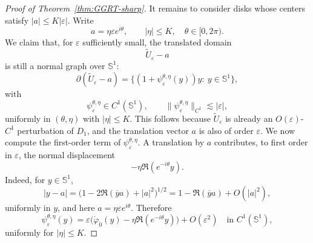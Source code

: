 \begin{proof}[Proof of Theorem~\ref{thm:GGRT-sharp}]
It remains to consider disks whose centers satisfy $|a|\leq K|\varepsilon|$.
Write
\[
a=\eta \varepsilon e^{i\theta},
\qquad
|\eta|\leq K,
\quad
\theta\in [0,2\pi).
\]
We claim that, for $\varepsilon$ sufficiently small, the translated domain
\[
\widetilde U_\varepsilon-a
\]
is still a normal graph over $\mathbb S^1$:
\[
\partial(\widetilde U_\varepsilon-a)
=
\{(1+\psi_\varepsilon^{\theta,\eta}(y))y:\ y\in \mathbb S^1\},
\]
with
\[
\psi_\varepsilon^{\theta,\eta}\in C^1(\mathbb S^1),
\qquad
\|\psi_\varepsilon^{\theta,\eta}\|_{C^1}\lesssim |\varepsilon|,
\]
uniformly in $(\theta,\eta)$ with $|\eta|\leq K$. This follows because
$\widetilde U_\varepsilon$ is already an $O(\varepsilon)$-$C^1$ perturbation of
$D_1$, and the translation vector $a$ is also of order $\varepsilon$. We now compute the first-order term of $\psi_\varepsilon^{\theta,\eta}$.
A translation by $a$ contributes, to first order in $\varepsilon$, the normal
displacement
\[
-\eta \Re(e^{-i\theta}y).
\]
Indeed, for \(y\in \mathbb S^1\),
\[
|y-a|
=
\bigl(1-2\Re(\overline y a)+|a|^2\bigr)^{1/2}
=
1-\Re(\overline y a)+O(|a|^2),
\]
uniformly in \(y\), and here \(a=\eta\varepsilon e^{i\theta}\).
Therefore
\begin{equation}\label{eq:psi-expansion-new}
\psi_\varepsilon^{\theta,\eta}(y)
=
\varepsilon\Big(\dot\varphi_0(y)-\eta \Re(e^{-i\theta}y)\Big)
+
O(\varepsilon^2)
\quad \text{in } C^1(\mathbb S^1),
\end{equation}
uniformly for $|\eta|\leq K$.


\end{proof}
